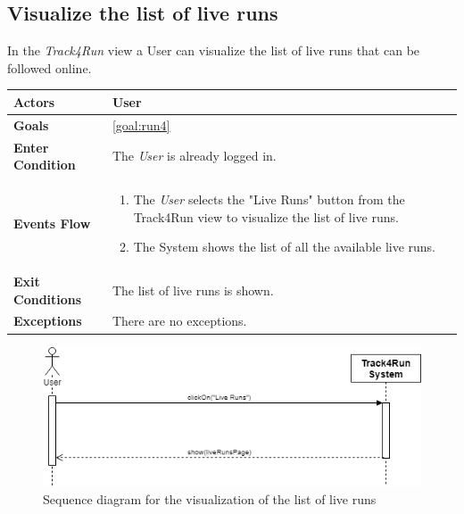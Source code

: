  \subsection{Visualize the list of live runs}
In the \emph{Track4Run} view a User can visualize the list of live runs that can be followed online.

\begin{table}[H]
	\centering
    
    \begin{tabular}{|p{3.5cm}|p{10.3cm}|}
    
    \hline
    \textbf{\large{Actors}} & User	 \\ 			
    \hline
    \textbf{\large{Goals}} 				& \ref{goal:run4}\\
    
    \hline
    \textbf{\large{Enter Condition}}	& The \emph{User} is already logged in.		\\
    
    \hline
    \textbf{\large{Events Flow}}		& \begin{enumerate}[leftmargin=0.5cm]
                                          	\item The \emph{User} selects the "Live Runs" button from the Track4Run view to visualize the list of live runs.
                                          	 \item The System shows the list of all the available live runs.
                                          \end{enumerate}
    										\\
    \hline
    \textbf{\large{Exit Conditions}}    & The list of live runs is shown.\\
    
    \hline
    \textbf{\large{Exceptions}} 		& There are no exceptions.\\
    
    \hline
    
    
    \end{tabular}
	
\end{table}

\begin{figure}[H]
    \centering
    \includegraphics[scale=0.4]{Pictures/visListLiveRunsSeqDiag.png}
    \caption{Sequence diagram for the visualization of the list of live runs}
\end{figure}
